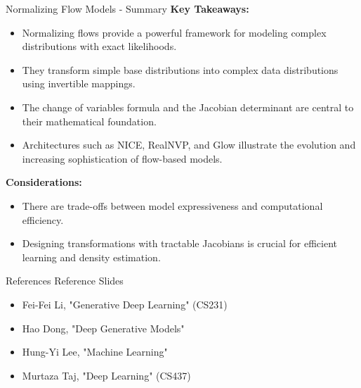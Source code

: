 \begin{frame}{Normalizing Flow Models - Summary}
\textbf{Key Takeaways:}
\begin{itemize}
    \item Normalizing flows provide a powerful framework for modeling complex distributions with exact likelihoods.
    \item They transform simple base distributions into complex data distributions using invertible mappings.
    \item The change of variables formula and the Jacobian determinant are central to their mathematical foundation.
    \item Architectures such as NICE, RealNVP, and Glow illustrate the evolution and increasing sophistication of flow-based models.
\end{itemize}

\textbf{Considerations:}
\begin{itemize}
    \item There are trade-offs between model expressiveness and computational efficiency.
    \item Designing transformations with tractable Jacobians is crucial for efficient learning and density estimation.
\end{itemize}
\end{frame}

\begin{frame}{References}
Reference Slides
\begin{itemize}
    \item Fei-Fei Li, "Generative Deep Learning" (CS231)
    \item Hao Dong, "Deep Generative Models"
    \item Hung-Yi Lee, "Machine Learning"
    \item Murtaza Taj, "Deep Learning" (CS437)
\end{itemize}
\end{frame}